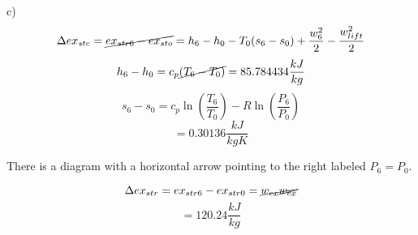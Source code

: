 c)
\[
\Delta ex_{stc} = \cancel{ex_{str6} - ex_{sto}} = h_6 - h_0 - T_0(s_6 - s_0) + \frac{w_6^2}{2} - \frac{w_{lift}^2}{2}
\]
\[
h_6 - h_0 = c_p \cancel{(T_6 - T_0)} = 85.784434 \frac{kJ}{kg}
\]
\[
s_6 - s_0 = c_p \ln \left( \frac{T_6}{T_0} \right) - R \ln \left( \frac{P_6}{P_0} \right)
\]
\[
= 0.30136 \frac{kJ}{kgK}
\]

There is a diagram with a horizontal arrow pointing to the right labeled \( P_6 = P_0 \).

\[
\Delta ex_{str} = ex_{str6} - ex_{str0} = \cancel{w_{ex} \cancel{w_{ex}}}
\]
\[
= 120.24 \frac{kJ}{kg}
\]